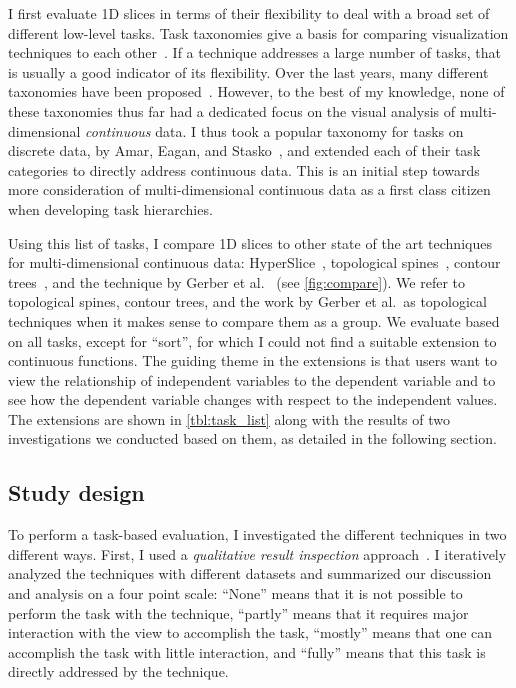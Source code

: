 I first evaluate 1D slices in terms of their flexibility to deal with a broad
set of different low-level tasks.  Task taxonomies give a basis for comparing
visualization techniques to each other~\cite{Munzner:2014}.
If a technique addresses a large number of tasks, that is usually a good
indicator of its flexibility.  Over the last years, many different taxonomies
have been proposed~\cite{Amar:2005,Brehmer:2013,Heer:2012,Sedlmair:2014}.
However, to the best of my knowledge, none of these taxonomies thus far had a
dedicated focus on the visual analysis of multi-dimensional \textit{continuous}
data. I thus took a popular taxonomy for tasks on discrete data, by Amar,
Eagan, and Stasko~\cite{Amar:2005}, and extended each of their task categories
to directly address continuous data. This is an initial step towards
more consideration of multi-dimensional continuous data as a first class
citizen when developing task hierarchies.

Using this list of tasks, I compare 1D slices to other state of the art
techniques for multi-dimensional continuous data: HyperSlice~\cite{Wijk:1993},
topological spines~\cite{Correa:2011}, contour trees~\cite{Carr:2003}, and the
technique by Gerber et al.~\cite{Gerber:2010} (see \autoref{fig:compare}).  We
refer to topological spines, contour trees, and the work by Gerber et al.\ as
topological techniques when it makes sense to compare them as a group.
We evaluate based on all tasks, except for ``sort'', for which I could not
find a suitable extension to continuous functions.  The guiding theme in the
extensions is that users want to view the relationship of independent variables
to the dependent variable and to see how the dependent variable changes with
respect to the independent values.  The extensions are shown in
\autoref{tbl:task_list} along with the results of two investigations we
conducted based on them, as detailed in the following section.
\subsection{Study design}

To perform a task-based evaluation, I investigated the different techniques in two different ways.
First, I used a \textit{qualitative result inspection}
approach~\cite{Isenberg:2013}. 
I iteratively analyzed the techniques with different datasets and summarized
our discussion and analysis on a four point scale:
``None'' means that it is not possible to perform the task with the technique,
``partly'' means that it requires major interaction with the view to accomplish
the task, ``mostly'' means that one can accomplish the task with little
interaction, and ``fully'' means that this task is directly addressed by the
technique. 

